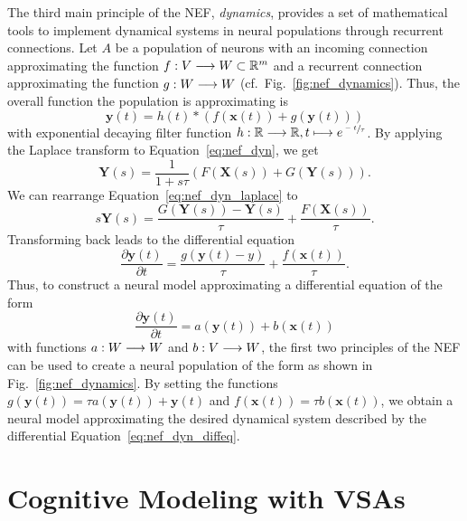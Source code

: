 The third main principle of the \ac{NEF}, \emph{dynamics}, provides a set of mathematical tools to implement dynamical systems in neural populations through recurrent connections.
Let $A$ be a population of neurons with an incoming connection approximating the function $f: V \longrightarrow W \subset \mathbb{R}^{m}$ and a recurrent connection approximating the function $g: W \longrightarrow W$ (cf.\ Fig.~\ref{fig:nef_dynamics}).
Thus, the overall function the population is approximating is
\begin{equation}
\mathbf{y}(t) = h(t) \ast \left(f(\mathbf{x}(t)) + g(\mathbf{y}(t))\right)
\label{eq:nef_dyn}
\end{equation}
with exponential decaying filter function $h: \mathbb{R} \longrightarrow \mathbb{R}, t \longmapsto e^{\sfrac{-t}{\tau}}$.
By applying the Laplace transform to Equation~\eqref{eq:nef_dyn}, we get
\begin{equation}
\label{eq:nef_dyn_laplace}
\mathbf{Y}(s) = \frac{1}{1 + s\tau}\left(F(\mathbf{X}(s)) + G(\mathbf{Y}(s))\right).
\end{equation}
We can rearrange Equation~\eqref{eq:nef_dyn_laplace} to
\begin{equation}
s\mathbf{Y}(s) = \frac{G(\mathbf{Y}(s))-\mathbf{Y}(s)}{\tau} + \frac{F(\mathbf{X}(s))}{\tau}.
\end{equation}
Transforming back leads to the differential equation
\begin{equation}
\frac{\partial \mathbf{y}(t)}{\partial t} = \frac{g(\mathbf{y}(t)-y)}{\tau} + \frac{f(\mathbf{x}(t))}{\tau}.
\end{equation}
Thus, to construct a neural model approximating a differential equation of the form
\begin{equation}
\frac{\partial \mathbf{y}(t)}{\partial t} = a(\mathbf{y}(t)) + b(\mathbf{x}(t))
\label{eq:nef_dyn_diffeq}
\end{equation}
with functions $a: W \longrightarrow W$ and $b: V \longrightarrow W$, the first two principles of the \ac{NEF} can be used to create a neural population of the form as shown in Fig.~\ref{fig:nef_dynamics}.
By setting the functions $g(\mathbf{y}(t))=\tau a(\mathbf{y}(t)) + \mathbf{y}(t)$ and $f(\mathbf{x}(t))=\tau b(\mathbf{x}(t))$, we obtain a neural model approximating the desired dynamical system described by the differential Equation~\eqref{eq:nef_dyn_diffeq}.

\section{Cognitive Modeling with \aclp{VSA}}%
\label{sec:cognitive_modelling_with_vsa}

